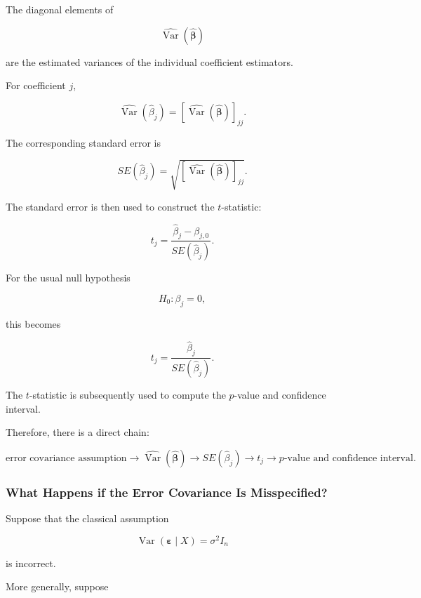 The diagonal elements of

\[
\widehat{\operatorname{Var}}
\left(
\widehat{\boldsymbol{\beta}}
\right)
\]

are the estimated variances of the individual coefficient estimators.

For coefficient \(j\),

\[
\boxed{
\widehat{\operatorname{Var}}
(\widehat{\beta}_j)
=
\left[
\widehat{\operatorname{Var}}
(\widehat{\boldsymbol{\beta}})
\right]_{jj}.
}
\]

The corresponding standard error is

\[
\boxed{
SE(\widehat{\beta}_j)
=
\sqrt{
\left[
\widehat{\operatorname{Var}}
(\widehat{\boldsymbol{\beta}})
\right]_{jj}
}.
}
\]

The standard error is then used to construct the \(t\)-statistic:

\[
\boxed{
t_j
=
\frac{
\widehat{\beta}_j-\beta_{j,0}
}{
SE(\widehat{\beta}_j)
}.
}
\]

For the usual null hypothesis

\[
H_0:\beta_j=0,
\]

this becomes

\[
\boxed{
t_j
=
\frac{
\widehat{\beta}_j
}{
SE(\widehat{\beta}_j)
}.
}
\]

The \(t\)-statistic is subsequently used to compute the \(p\)-value and
confidence interval.

Therefore, there is a direct chain:

\[
\boxed{
\text{error covariance assumption}
\longrightarrow
\widehat{\operatorname{Var}}(\widehat{\boldsymbol{\beta}})
\longrightarrow
SE(\widehat{\beta}_j)
\longrightarrow
t_j
\longrightarrow
p\text{-value and confidence interval}.
}
\]



\subsubsection*{What Happens if the Error Covariance Is Misspecified?}

Suppose that the classical assumption

\[
\operatorname{Var}
(\boldsymbol{\varepsilon}\mid X)
=
\sigma^2I_n
\]

is incorrect.

More generally, suppose

